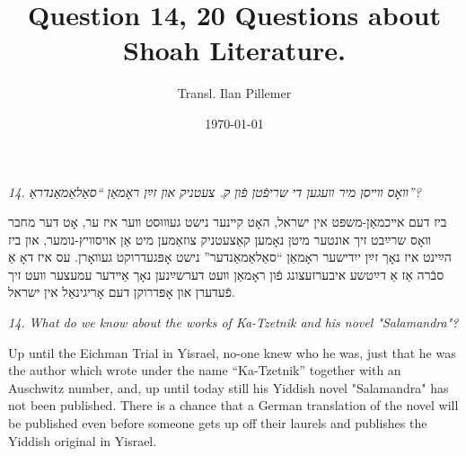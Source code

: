 \documentclass{article}
\begin{document}
\renewcommand{\abstractname}{\vspace{-\baselineskip}}
\title{Question 14, 20 Questions about Shoah Literature.}
\author{Transl. Ilan Pillemer}
\date{\today}

\maketitle
{}
\newline

\begin{pairs}

\begin{Rightside}

\begin{RTL}
\begin{hebrew}
\beginnumbering
\autopar
\emph{
14.
װאָס װײסן מיר װעגען די שריפֿטן פֿון ק. צעטניק און זײַן ראָמאַן ``סאַלאַמאַנדראַ''?
}
\newline

ביז דעם אײכמאַן-משפּט אין ישראל, האָט קײנער נישט געװוּסט װער איז ער, אָט דער מחבר װאָס שרײַבט זיך אונטער מיטן נאָמען קאַצעטניק צוזאַמען מיט אַן אויסװיץ-נומער,
 און ביז הײַינט איז נאָך זײַן ייִדישער ראָמאַן ``סאַלאַמאַנדער'' נישט אָפּגעדרוקט געװאָרן.
עס איז דאָ אַ סבֿרה אַז אַ דײַטשע איבערזעצונג פֿון ראָמאַן װעט דערשײַנען נאָך אַײדער עמעצער װעט זיך פֿעדערן און אָפּדרוקן דעם אָריגינאַל אין ישראל. 

\endnumbering
\end{hebrew}
\end{RTL}
\end{Rightside}


\begin{Leftside}
\begin{english}
\beginnumbering
\autopar
\emph{
14.
What do we know about the works of Ka-Tzetnik  and his novel "Salamandra"?
}
 
 Up until the Eichman Trial in Yisrael, no-one knew who he was, just that he was the author which wrote under the name 
 ``Ka-Tzetnik''
together with an Auschwitz number, and, up until today still his Yiddish novel "Salamandra" has not been published.
There is a chance that a German translation of the novel will be published even before someone
gets up off their laurels and publishes the Yiddish original in Yisrael.
 
\endnumbering
\end{english}
\end{Leftside}

\end{pairs}
\Columns
\end{document}
